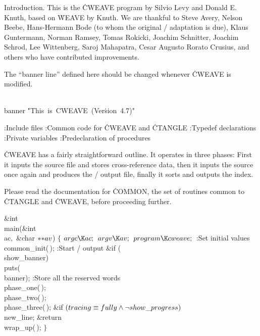 Introduction.
This is the \.{CWEAVE} program by Silvio Levy and Donald E. Knuth,
based on \.{WEAVE} by Knuth.
We are thankful to Steve Avery,
Nelson Beebe, Hans-Hermann Bode (to whom the original \CPLUSPLUS/ adaptation
is due), Klaus Guntermann, Norman Ramsey, Tomas Rokicki, Joachim Schnitter,
Joachim Schrod, Lee Wittenberg, Saroj Mahapatra, Cesar Augusto Rorato
Crusius, and others who have contributed improvements.

The ``banner line'' defined here should be changed whenever \.{CWEAVE}
is modified.

\Y\B\4\D\\{banner}\5
\.{"This\ is\ CWEAVE\ (Ver}\)\.{sion\ 4.7)"}\par
\Y\B{}:Include files\X\6
\ATH\6
:Common code for \.{CWEAVE} and \.{CTANGLE}\X\6
:Typedef declarations\X\6
:Private variables\X\6
:Predeclaration of procedures\X\par
\fi

\.{CWEAVE} has a fairly straightforward outline.  It operates in
three phases: First it inputs the source file and stores cross-reference
data, then it inputs the source once again and produces the \TEX/ output
file, finally it sorts and outputs the index.

Please read the documentation for \.{COMMON}, the set of routines common
to \.{CTANGLE} and \.{CWEAVE}, before proceeding further.

\Y\B\1\1\&{int} \\{main}(\&{int} \\{ac}${},{}$\6
\&{char} ${}{*}{*}\\{av}{}$)\2\2\6
${}\{{}$\1\6
${}\\{argc}\K\\{ac};{}$\6
${}\\{argv}\K\\{av};{}$\6
${}\\{program}\K\\{cweave};{}$\6
:Set initial values\X\6
\\{common\_init}(\,);\6
:Start \TEX/ output\X\6
\&{if} (\\{show\_banner})\1\5
\\{puts}(\\{banner});\2\6
:Store all the reserved words\X\6
\\{phase\_one}(\,);\6
\\{phase\_two}(\,);%
\6
\\{phase\_three}(\,);\6
\&{if} ${}(\\{tracing}\equiv\\{fully}\land\lnot\\{show\_progress}){}$\1\5
\\{new\_line};\2\6
\&{return} \\{wrap\_up}(\,);\6
\4${}\}{}$\2\par
\fi

